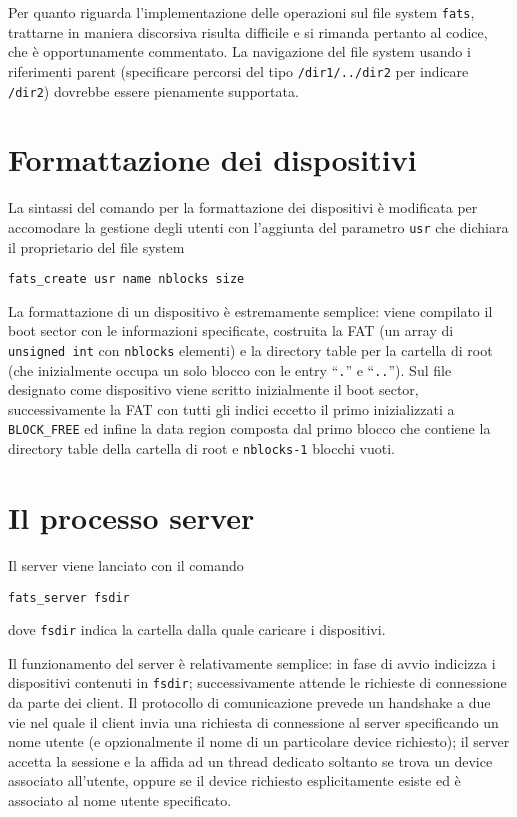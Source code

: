 \documentclass[11pt,oneside,a4paper]{article}
\begin{document}
Per quanto riguarda l'implementazione delle operazioni sul file system \texttt{fats}, trattarne in maniera discorsiva risulta difficile e si rimanda pertanto al codice, che è opportunamente commentato. La navigazione del file system usando i riferimenti parent (specificare percorsi del tipo \texttt{/dir1/../dir2} per indicare \texttt{/dir2}) dovrebbe essere pienamente supportata.

\section{Formattazione dei dispositivi}
\label{sec:create}
La sintassi del comando per la formattazione dei dispositivi è modificata per accomodare la gestione degli utenti con l'aggiunta del parametro \texttt{usr} che dichiara il proprietario del file system
\begin{center}
\texttt{fats\_create usr name nblocks size}
\end{center}

La formattazione di un dispositivo è estremamente semplice: viene compilato il boot sector con le informazioni specificate, costruita la FAT (un array di \texttt{unsigned int} con \texttt{nblocks} elementi) e la directory table per la cartella di root (che inizialmente occupa un solo blocco con le entry ``\texttt{.}'' e ``\texttt{..}''). Sul file designato come dispositivo viene scritto inizialmente il boot sector, successivamente la FAT con tutti gli indici eccetto il primo inizializzati a \texttt{BLOCK\_FREE} ed infine la data region composta dal primo blocco che contiene la directory table della cartella di root e \texttt{nblocks-1} blocchi vuoti.

\section{Il processo server}
\label{sec:server}
Il server viene lanciato con il comando
\begin{center}
\texttt{fats\_server fsdir}
\end{center}
dove \texttt{fsdir} indica la cartella dalla quale caricare i dispositivi.

Il funzionamento del server è relativamente semplice: in fase di avvio indicizza i dispositivi contenuti in \texttt{fsdir}; successivamente attende le richieste di connessione da parte dei client. Il protocollo di comunicazione prevede un handshake a due vie nel quale il client invia una richiesta di connessione al server specificando un nome utente (e opzionalmente il nome di un particolare device richiesto); il server accetta la sessione e la affida ad un thread dedicato soltanto se trova un device associato all'utente, oppure se il device richiesto esplicitamente esiste ed è associato al nome utente specificato.
\end{document}
